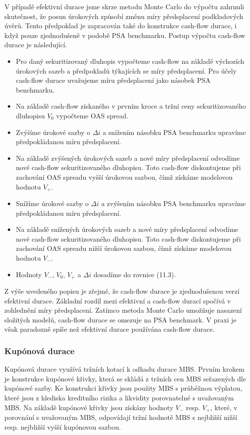 \documentclass[a4paper]{book}
\begin{document}
V případě efektivní durace jsme skrze metodu Monte Carlo do výpočtu zahrnuli skutečnost, že posun úrokových způsobí změnu míry předsplacení podkladových úvěrů. Tento předpoklad je zapracován také do konstrukce cash-flow durace, i když pouze zjednodušeně v podobě PSA benchmarku. Postup výpočtu cash-flow durace je následující.
\begin{itemize}
\item Pro daný sekuritizovaný dluhopis vypočteme cash-flow na základě výchozích úrokových sazeb a předpokladů týkajících se míry předsplacení. Pro účely cash-flow durace uvažujeme míru předsplacení jako násobek PSA benchmarku.
\item Na základě cash-flow získaného v prvním kroce a tržní ceny sekuritizovaného dluhopisu $V_0$ vypočteme OAS spread.
\item Zvýšíme úrokové sazby o $\Delta i$ a snížením násobku PSA benchmarku upravíme předpokládanou míru předsplacení.
\item Na základě zvýšených úrokových sazeb a nové míry předsplacení odvodíme nové cash-flow sekuritizovaného dluhopisu. Toto cash-flow diskontujeme při zachování OAS spreadu vyšší úrokovou sazbou, čímž získáme modelovou hodnotu $V_{+}$.
\item Snížíme úrokové sazby o $\Delta i$ a zvýšením násobku PSA benchmarku upravíme předpokládanou míru předsplacení.
\item Na základě snížených úrokových sazeb a nové míry předsplacení odvodíme nové cash-flow sekuritizovaného dluhopisu. Toto cash-flow diskontujeme při zachování OAS spreadu nižší úrokovou sazbou, čímž získáme modelovou hodnotu $V_{-}$.
\item Hodnoty $V_{-}$, $V_0$, $V_{+}$ a $\Delta i$ dosadíme do rovnice (11.3).
\end{itemize}
Z výše uvedeného popisu je zřejmé, že cash-flow durace je zjednodušenou verzí efektivní durace. Základní rozdíl mezi efektivní a cash-flow durací spočívá v zohlednění míry předsplacení. Zatímco metoda Monte Carlo umožňuje nasazení složitých modelů, cash-flow durace se omezuje na PSA benchmark. V praxi je však paradoxně spíše než efektivní durace používána cash-flow durace.

\subsubsection{Kupónová durace}

Kupónová durace využívá tržních kotací k odhadu durace MBS. Prvním krokem je konstrukce kupónové křivky, která se skládá z tržních cen MBS seřazených dle kupónové sazby. Ke konstrukci křivky jsou použity MBS s průběžnou výplatou, které jsou z hlediska kreditního rizika a likvidity porovnatelné s uvažovaným MBS. Na základě kupónové křivky jsou získány hodnoty $V_{-}$ resp. $V_{+}$, které, v porovnání s uvažovaným MBS, odpovídají tržní hodnotě MBS s nejbližší nižší resp. nejbližší vyšší kupónovou sazbou. 
\end{document}

